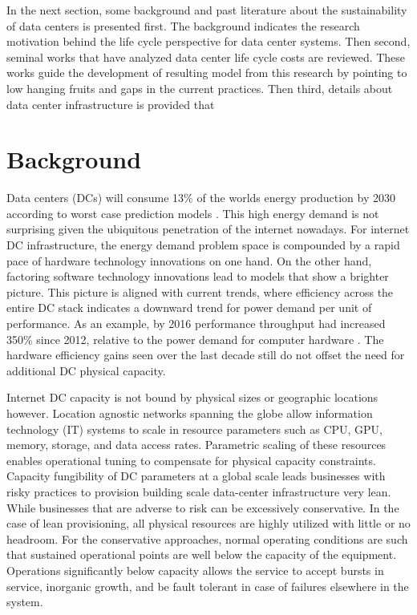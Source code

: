     In the next section, some background and past literature about the sustainability of data centers is presented first. The background indicates the research motivation behind the life cycle perspective for data center systems. Then second, seminal works that have analyzed data center life cycle costs are reviewed. These works guide the development of resulting model from this research by pointing to low hanging fruits and gaps in the current practices. Then third, details about data center infrastructure is provided that 

\section{Background}

    Data centers (DCs) will consume 13\% of the worlds energy production by 2030 according to worst case prediction models \cite{andrae15}. This high energy demand is not surprising given the ubiquitous penetration of the internet nowadays. For internet DC infrastructure, the energy demand problem space is compounded by a rapid pace of hardware technology innovations on one hand. On the other hand, factoring software technology innovations lead to models that show a brighter picture. This picture is aligned with current trends, where efficiency across the entire DC stack indicates a downward trend for power demand per unit of performance. As an example, by 2016 performance throughput had increased 350\% since 2012, relative to the power demand for computer hardware \cite{GoogleEnvRpt}.  The hardware efficiency gains seen over the last decade still do not offset the need for additional DC physical capacity.
    
    Internet DC capacity is not bound by physical sizes or geographic locations however. Location agnostic networks spanning the globe allow information technology (IT) systems to scale in resource parameters such as CPU, GPU, memory, storage, and data access rates. Parametric scaling of these resources enables operational tuning to compensate for physical capacity constraints. Capacity fungibility of DC parameters at a global scale leads businesses with risky practices to provision building scale data-center infrastructure very lean. While businesses that are adverse to risk can be excessively conservative. In the case of lean provisioning, all physical resources are highly utilized with little or no headroom. For the conservative approaches, normal operating conditions are such that sustained operational points are well below the capacity of the equipment. Operations significantly below capacity allows the service to accept bursts in service, inorganic  growth, and be fault tolerant in case of failures elsewhere in the system. 
    
